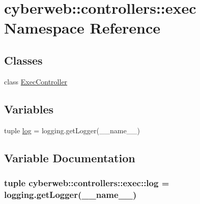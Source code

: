 \hypertarget{namespacecyberweb_1_1controllers_1_1exec}{\section{cyberweb\-:\-:controllers\-:\-:exec \-Namespace \-Reference}
\label{namespacecyberweb_1_1controllers_1_1exec}
}
\subsection*{\-Classes}
\begin{DoxyCompactItemize}
\item 
class \hyperlink{classcyberweb_1_1controllers_1_1exec_1_1_exec_controller}{\-Exec\-Controller}
\end{DoxyCompactItemize}
\subsection*{\-Variables}
\begin{DoxyCompactItemize}
\item 
tuple \hyperlink{namespacecyberweb_1_1controllers_1_1exec_a24e606abc5ce3cb3656f125e58fc101f}{log} = logging.\-get\-Logger(\-\_\-\-\_\-name\-\_\-\-\_\-)
\end{DoxyCompactItemize}


\subsection{\-Variable \-Documentation}
\hypertarget{namespacecyberweb_1_1controllers_1_1exec_a24e606abc5ce3cb3656f125e58fc101f}{
\subsubsection[{log}]{\setlength{\rightskip}{0pt plus 5cm}tuple {\bf cyberweb\-::controllers\-::exec\-::log} = logging.\-get\-Logger(\-\_\-\-\_\-name\-\_\-\-\_\-)}}\label{namespacecyberweb_1_1controllers_1_1exec_a24e606abc5ce3cb3656f125e58fc101f}
